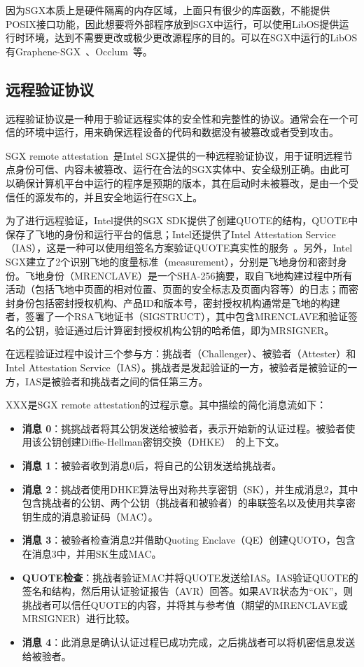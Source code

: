 因为SGX本质上是硬件隔离的内存区域，上面只有很少的库函数，不能提供POSIX接口功能，因此想要将外部程序放到SGX中运行，可以使用LibOS提供运行时环境，达到不需要更改或极少更改源程序的目的。可以在SGX中运行的LibOS有Graphene-SGX~\cite{}、Occlum~\cite{}等。

\subsection{远程验证协议}

远程验证协议是一种用于验证远程实体的安全性和完整性的协议。通常会在一个可信的环境中运行，用来确保远程设备的代码和数据没有被篡改或者受到攻击。

SGX remote attestation~\cite{}是Intel SGX提供的一种远程验证协议，用于证明远程节点身份可信、内容未被篡改、运行在合法的SGX实体中、安全级别正确。由此可以确保计算机平台中运行的程序是预期的版本，其在启动时未被篡改，是由一个受信任的源发布的，并且安全地运行在SGX上。

为了进行远程验证，Intel提供的SGX SDK提供了创建QUOTE的结构，QUOTE中保存了飞地的身份和运行平台的信息；Intel还提供了Intel Attestation Service（IAS），这是一种可以使用组签名方案验证QUOTE真实性的服务~\cite{}。另外，Intel SGX建立了2个识别飞地的度量标准（measurement），分别是飞地身份和密封身份。飞地身份（MRENCLAVE）是一个SHA-256摘要，取自飞地构建过程中所有活动（包括飞地中页面的相对位置、页面的安全标志及页面内容等）的日志；而密封身份包括密封授权机构、产品ID和版本号，密封授权机构通常是飞地的构建者，签署了一个RSA飞地证书（SIGSTRUCT），其中包含MRENCLAVE和验证签名的公钥，验证通过后计算密封授权机构公钥的哈希值，即为MRSIGNER。

在远程验证过程中设计三个参与方：挑战者（Challenger）、被验者（Attester）和Intel Attestation Service（IAS）。挑战者是发起验证的一方，被验者是被验证的一方，IAS是被验者和挑战者之间的信任第三方。


XXX是SGX remote attestation的过程示意。其中描绘的简化消息流如下：

\begin{itemize}
    \item \textbf{消息 0}：挑挑战者将其公钥发送给被验者，表示开始新的认证过程。被验者使用该公钥创建Diffie-Hellman密钥交换（DHKE）~\cite{}的上下文。%
    \item \textbf{消息 1}：被验者收到消息0后，将自己的公钥发送给挑战者。
    \item \textbf{消息 2}：挑战者使用DHKE算法导出对称共享密钥（SK），并生成消息2，其中包含挑战者的公钥、两个公钥（挑战者和被验者）的串联签名以及使用共享密钥生成的消息验证码（MAC）。
    \item \textbf{消息 3}：被验者检查消息2并借助Quoting Enclave（QE）创建QUOTO，包含在消息3中，并用SK生成MAC。
    \item \textbf{QUOTE检查}：挑战者验证MAC并将QUOTE发送给IAS。IAS验证QUOTE的签名和结构，然后用认证验证报告（AVR）回答。如果AVR状态为“OK”，则挑战者可以信任QUOTE的内容，并将其与参考值（期望的MRENCLAVE或MRSIGNER）进行比较。
    \item \textbf{消息 4}：此消息是确认认证过程已成功完成，之后挑战者可以将机密信息发送给被验者。
\end{itemize}

